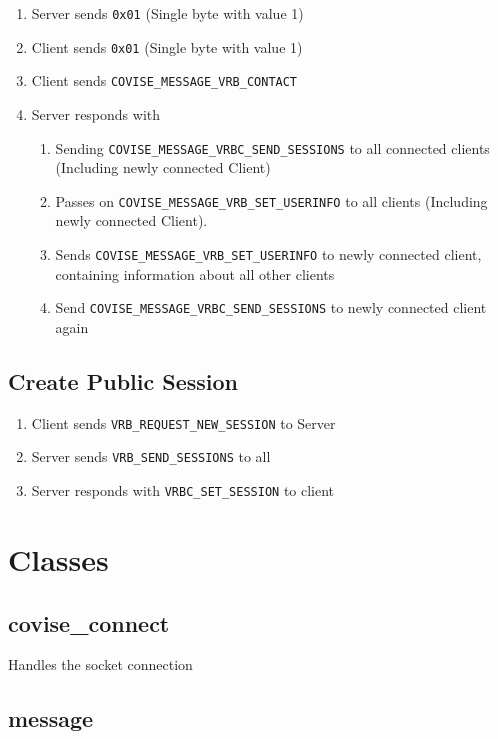 \begin{enumerate}
	\item Server sends \lstinline|0x01| (Single byte with value 1)
	\item Client sends \lstinline|0x01| (Single byte with value 1)
	\item Client sends \lstinline|COVISE_MESSAGE_VRB_CONTACT|
	\item Server responds with 	
	\begin{enumerate}
		\item Sending \lstinline|COVISE_MESSAGE_VRBC_SEND_SESSIONS| to all connected clients (Including newly connected Client)
		\item Passes on \lstinline|COVISE_MESSAGE_VRB_SET_USERINFO| to all clients (Including newly connected Client). 
		\item Sends \lstinline|COVISE_MESSAGE_VRB_SET_USERINFO| to newly connected client, containing information about all other clients
		\item Send \lstinline|COVISE_MESSAGE_VRBC_SEND_SESSIONS| to newly connected client again
	\end{enumerate}
\end{enumerate}

\subsection{Create Public Session}

\begin{enumerate}
	\item Client sends \lstinline|VRB_REQUEST_NEW_SESSION| to Server
	\item Server sends \lstinline|VRB_SEND_SESSIONS| to all
	\item Server responds with \lstinline|VRBC_SET_SESSION| to client
\end{enumerate}

\section{Classes}

\subsection{covise\_connect}

Handles the socket connection 

\subsection{message}

